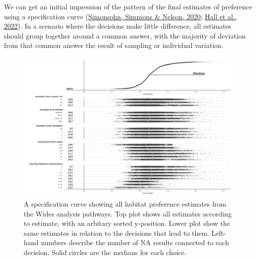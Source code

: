 \documentclass[10pt,a4paper]{article}
\begin{document}
We can get an initial impression of the pattern of the final estimates of preference using a specification curve (\protect\hyperlink{ref-simonsohn_specification_2020}{Simonsohn, Simmons \& Nelson, 2020}; \protect\hyperlink{ref-hall_survey_2022}{Hall et al., 2022}).
In a scenario where the decisions make little difference, all estimates should group together around a common answer, with the majority of deviation from that common answer the result of sampling or individual variation.

\begin{figure}
\includegraphics[width=1\linewidth]{../figures/widesSpecCurve} \caption{A specification curve showing all habitat preference estimates from the Wides analysis pathways. Top plot shows all estimates according to estimate, with an arbitary sorted y-position. Lower plot show the same estimates in relation to the decisions that lead to them. Left-hand numbers describe the number of NA results connected to each decision. Solid circles are the medians for each choice.}\label{fig:specCurveWides}
\end{figure}
\end{document}
